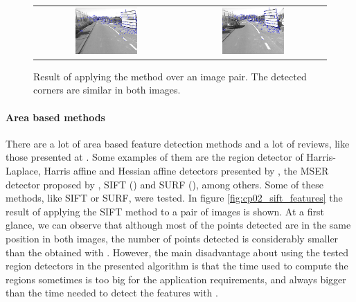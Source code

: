 \begin{figure}[h!]
\begin{tabular}{cc}
\includegraphics[width=0.45\textwidth]{featuresShi1}\label{fig:cp02_features_shi_1} &
\includegraphics[width=0.45\textwidth]{featuresShi2}\label{fig:cp02_features_shi_2}
\end{tabular}
\caption{Result of applying the \cite{shi1994good} method over an image pair. The detected corners are similar in both images.}\label{fig:cp02_shi_tomasi_features}
\end{figure}

\paragraph{Area based methods}\label{ch:chapter02_01_02_01_02}

There are a lot of area based feature detection methods and a lot of reviews, like those presented at \cite{mikolajczyk2005comparison, li2008comprehensive}. Some examples of them are the region detector of Harris-Laplace, Harris affine and Hessian affine detectors presented by \cite{mikolajczyk2004scale}, the MSER detector proposed by \cite{matas2004robust}, SIFT (\cite{lowe1999object}) and SURF (\cite{bay2008speeded}), among others. Some of these methods, like SIFT or SURF, were tested. In figure \ref{fig:cp02_sift_features} the result of applying the SIFT method to a pair of images is shown. At a first glance, we can observe that although most of the points detected are in the same position in both images, the number of points detected is considerably smaller than the obtained with \cite{shi1994good}. However, the main disadvantage about using the tested region detectors in the presented algorithm is that the time used to compute the regions sometimes is too big for the application requirements, and always bigger than the time needed to detect the features with \cite{shi1994good}.

